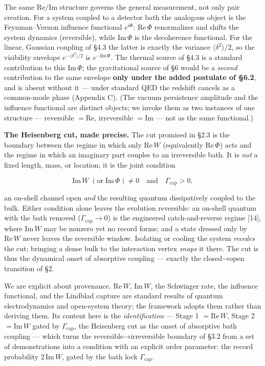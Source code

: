 \documentclass[
]{article}
\begin{document}
The same \(\mathrm{Re}/\mathrm{Im}\) structure governs the general
measurement, not only pair creation. For a system coupled to a detector
bath the analogous object is the Feynman--Vernon influence functional
\(e^{i\Phi}\): \(\mathrm{Re}\,\Phi\) renormalizes and shifts the system
dynamics (reversible), while \(\mathrm{Im}\,\Phi\) is the decoherence
functional. For the linear, Gaussian coupling of §4.3 the latter is
exactly the variance \(\langle\delta^2\rangle/2\), so the visibility
envelope \(e^{-\langle\delta^2\rangle/2}\) is
\(e^{-\mathrm{Im}\,\Phi}\). The thermal source of §4.3 is a standard
contribution to this \(\mathrm{Im}\,\Phi\); the gravitational source of
§6 would be a \emph{second} contribution to the same envelope
\textbf{only under the added postulate of §6.2}, and is absent without
it --- under standard QED the redshift cancels as a common-mode phase
(Appendix C). (The vacuum persistence amplitude and the influence
functional are distinct objects; we invoke them as two instances of one
structure --- reversible \(=\mathrm{Re}\), irreversible \(=\mathrm{Im}\)
--- not as the same functional.)

\textbf{The Heisenberg cut, made precise.} The cut promised in §2.3 is
the boundary between the regime in which only \(\mathrm{Re}\,W\)
(equivalently \(\mathrm{Re}\,\Phi\)) acts and the regime in which an
imaginary part couples to an irreversible bath. It is \emph{not} a fixed
length, mass, or location; it is the joint condition

\[\mathrm{Im}\,W \;(\text{or}\;\mathrm{Im}\,\Phi)\neq 0 \quad\text{and}\quad \Gamma_{\text{cap}}>0,\]

an on-shell channel open \emph{and} the resulting quantum dissipatively
coupled to the bulk. Either condition alone leaves the evolution
reversible: an on-shell quantum with the bath removed
(\(\Gamma_{\text{cap}}\to 0\)) is the engineered catch-and-reverse
regime {[}14{]}, where \(\mathrm{Im}\,W\) may be nonzero yet no record
forms; and a state dressed only by \(\mathrm{Re}\,W\) never leaves the
reversible window. Isolating or cooling the system \emph{recedes} the
cut; bringing a dense bulk to the interaction vertex \emph{snaps} it
there. The cut is thus the dynamical onset of absorptive coupling ---
exactly the closed→open transition of §2.

We are explicit about provenance. \(\mathrm{Re}\,W\),
\(\mathrm{Im}\,W\), the Schwinger rate, the influence functional, and
the Lindblad capture are standard results of quantum electrodynamics and
open-system theory; the framework adopts them rather than deriving them.
Its content here is the \emph{identification} --- Stage 1
\(=\mathrm{Re}\,W\), Stage 2 \(=\mathrm{Im}\,W\) gated by
\(\Gamma_{\text{cap}}\), the Heisenberg cut as the onset of absorptive
bath coupling --- which turns the reversible→irreversible boundary of
§3.2 from a set of demonstrations into a condition with an explicit
order parameter: the record probability \(2\,\mathrm{Im}\,W\), gated by
the bath lock \(\Gamma_{\text{cap}}\).
\end{document}
